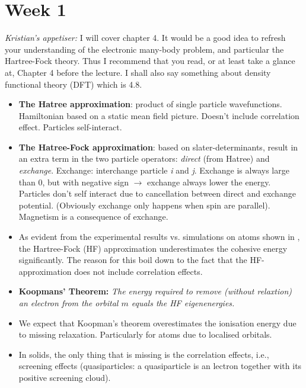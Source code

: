 \section*{Week 1}\label{sec:week1}
\emph{Kristian's appetiser:}  I will cover chapter 4. It would be a good idea to refresh your understanding of the electronic many-body problem, and particular the Hartree-Fock theory. Thus I recommend that you read, or at least take a glance at, Chapter 4 before the lecture. I shall also say something about density functional theory (DFT) which is 4.8.\\

\begin{itemize}
    \item \textbf{The Hatree approximation}: product of single particle wavefunctions. Hamiltonian based on a static mean field picture. Doesn't include correlation effect. Particles self-interact.
    \item \textbf{The Hatree-Fock approximation}: based on slater-determinants, result in an extra term in the two particle operators: \emph{direct} (from Hatree) and \emph{exchange}. Exchange: interchange particle \emph{i} and \emph{j}. Exchange is always large than 0, but with negative sign $\rightarrow$ exchange always lower the energy. Particles don't self interact due to cancellation between direct and exchange potential. (Obviously exchange only happens when spin are parallel). Magnetism is a consequence of exchange.%
    \item As evident from the experimental results vs. simulations on atoms shown in , the Hartree-Fock (HF) approximation underestimates the cohesive energy significantly.
    The reason for this boil down to the fact that the HF-approximation does not include correlation effects. 
    \item \textbf{Koopmans' Theorem:} \emph{The energy required to remove (without relaxtion) an electron from the orbital $m$ equals the HF eigenenergies.}
    \item We expect that Koopman's theorem overestimates the ionisation energy due to missing relaxation. Particularly for atoms due to localised orbitals. %
    \item In solids, the only thing that is missing is the correlation effects, i.e., screening effects (quasiparticles: a quasiparticle is an lectron together with its positive screening cloud).
\end{itemize}


